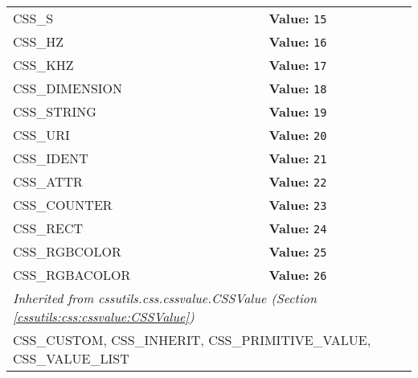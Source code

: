 \begin{longtable}{|p{\varnamewidth}|p{\vardescrwidth}|l}
\cline{1-2}
\raggedright C\-S\-S\-\_\-S\- & \raggedright \textbf{Value:} 
{\tt 15}&\\
\cline{1-2}
\raggedright C\-S\-S\-\_\-H\-Z\- & \raggedright \textbf{Value:} 
{\tt 16}&\\
\cline{1-2}
\raggedright C\-S\-S\-\_\-K\-H\-Z\- & \raggedright \textbf{Value:} 
{\tt 17}&\\
\cline{1-2}
\raggedright C\-S\-S\-\_\-D\-I\-M\-E\-N\-S\-I\-O\-N\- & \raggedright \textbf{Value:} 
{\tt 18}&\\
\cline{1-2}
\raggedright C\-S\-S\-\_\-S\-T\-R\-I\-N\-G\- & \raggedright \textbf{Value:} 
{\tt 19}&\\
\cline{1-2}
\raggedright C\-S\-S\-\_\-U\-R\-I\- & \raggedright \textbf{Value:} 
{\tt 20}&\\
\cline{1-2}
\raggedright C\-S\-S\-\_\-I\-D\-E\-N\-T\- & \raggedright \textbf{Value:} 
{\tt 21}&\\
\cline{1-2}
\raggedright C\-S\-S\-\_\-A\-T\-T\-R\- & \raggedright \textbf{Value:} 
{\tt 22}&\\
\cline{1-2}
\raggedright C\-S\-S\-\_\-C\-O\-U\-N\-T\-E\-R\- & \raggedright \textbf{Value:} 
{\tt 23}&\\
\cline{1-2}
\raggedright C\-S\-S\-\_\-R\-E\-C\-T\- & \raggedright \textbf{Value:} 
{\tt 24}&\\
\cline{1-2}
\raggedright C\-S\-S\-\_\-R\-G\-B\-C\-O\-L\-O\-R\- & \raggedright \textbf{Value:} 
{\tt 25}&\\
\cline{1-2}
\raggedright C\-S\-S\-\_\-R\-G\-B\-A\-C\-O\-L\-O\-R\- & \raggedright \textbf{Value:} 
{\tt 26}&\\
\cline{1-2}
\multicolumn{2}{|l|}{\textit{Inherited from cssutils.css.cssvalue.CSSValue \textit{(Section \ref{cssutils:css:cssvalue:CSSValue})}}}\\
\multicolumn{2}{|p{\varwidth}|}{\raggedright CSS\_CUSTOM, CSS\_INHERIT, CSS\_PRIMITIVE\_VALUE, CSS\_VALUE\_LIST}\\
\cline{1-2}
\end{longtable}



